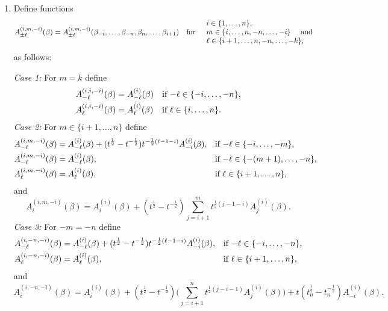 \documentclass[11pt]{article}
\theoremstyle{plain}
\theoremstyle{definition}
\theoremstyle{remark}
\numberwithin{equation}{section}
\newcounter{r}
\newcounter{s}
\begin{document}
\begin{enumerate}
\item[(CS1gen)] Define functions
$$A^{(i,m,-i)}_{\pm\ell}(\beta)
=A^{(i,m,-i)}_{\pm\ell}(\beta_{-i}, \ldots, \beta_{-n}, \beta_n, \ldots, \beta_{i+1})
\quad\hbox{for}\quad \begin{array}{l}
\hbox{$i\in \{1, \ldots, n\}$,} \\
\hbox{$m\in \{i, \ldots, n, -n, \ldots, -i\}$ \quad and} \\
\hbox{$\ell\in \{i+1, \ldots, n, -n, \ldots, -k\}$,}
\end{array}
$$
as follows:

\smallskip\noindent
\emph{Case 1:} For $m=k$ define
\begin{align}
A^{(i,i,-i)}_{-\ell}(\beta) &= A^{(i)}_{-\ell}(\beta)&&\hbox{if $-\ell\in \{-i, \ldots, -n\}$,} 
\nonumber \\
A^{(i,i,-i)}_{\ell}(\beta) &= A^{(i)}_{\ell}(\beta)&&\hbox{if $\ell\in \{i, \ldots, n\}$.} 
\label{AgencA}
\end{align}
\emph{Case 2:} For $m\in \{i+1, \ldots, n\}$ define
\begin{align*}
A^{(i,m,-i)}_{-\ell}(\beta) &= A^{(i)}_{-\ell}(\beta) + (t^{\frac12}-t^{-\frac{1}{2}})t^{-\frac{1}{2}(\ell-1-i)} A^{(i)}_{-i}(\beta), 
&&\hbox{if $-\ell\in \{-i, \ldots, -m\}$,} 
\\
A^{(i,m,-i)}_{-\ell}(\beta) &= A^{(i)}_{-\ell}(\beta), &&\hbox{if $-\ell\in \{-(m+1), \ldots, -n\}$,} 
\\
A^{(i,m,-i)}_{\ell}(\beta) &= A^{(i)}_{\ell}(\beta), &&\hbox{if $\ell\in \{i+1, \ldots, n\}$,} 
\end{align*}
and
\begin{equation}
A^{(i,m,-i)}_i(\beta) = A^{(i)}_i(\beta) + (t^{\frac12}-t^{-\frac12})
\sum_{j=i+1}^m t^{\frac12(j-1-i)} A^{(i)}_j(\beta).
\label{AgencB}
\end{equation}
\emph{Case 3:}  For $-m = -n$ define
\begin{align*}
A^{(i,-n,-i)}_{-\ell}(\beta) &= A^{(i)}_{-\ell}(\beta) + (t^{\frac12}-t^{-\frac{1}{2}})t^{-\frac{1}{2}(\ell-1-i)}A^{(i)}_{-i}(\beta), 
&&\hbox{if $-\ell\in \{-i, \ldots, -n\}$,} 
\\
A^{(i,-n,-i)}_{\ell}(\beta) &= A^{(i)}_{\ell}(\beta), &&\hbox{if $\ell\in \{i+1, \ldots, n\}$,} 
\end{align*}
and
  \begin{equation}
A^{(i,-n,-i)}_i(\beta) = A^{(i)}_i(\beta) +  (t^{\frac12}-t^{-\frac12})
\Big(\sum_{j=i+1}^n t^{\frac12(j-i-1)} A^{(i)}_j(\beta) \Big) + t(t_n^{\frac12}-t_n^{-\frac12}) A^{(i)}_{-i}(\beta).

\end{equation}
\end{enumerate}
\end{document}
